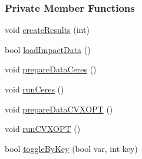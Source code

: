 \subsubsection*{\-Private \-Member \-Functions}
\begin{DoxyCompactItemize}
\item 
void \hyperlink{classTransfer_a34f1f7a9798fa745146e78479b272466}{create\-Results} (int)
\item 
bool \hyperlink{classTransfer_afc4d713370e82897d51c7e457e4e1a27}{load\-Impact\-Data} ()
\item 
void \hyperlink{classTransfer_acf5b4e91e2709e7d3cad23bb9afed9f0}{prepare\-Data\-Ceres} ()
\item 
void \hyperlink{classTransfer_a1748cd66a053bd5d224c229609abe696}{run\-Ceres} ()
\item 
void \hyperlink{classTransfer_a523f1a6b3ea20746cda7204901ec1762}{prepare\-Data\-C\-V\-X\-O\-P\-T} ()
\item 
void \hyperlink{classTransfer_a2c6905f83dcd836be8635d7141392351}{run\-C\-V\-X\-O\-P\-T} ()
\item 
bool \hyperlink{classTransfer_a54775d04e460f94fb6d32ceac5dd4260}{toggle\-By\-Key} (bool var, int key)
\end{DoxyCompactItemize}
